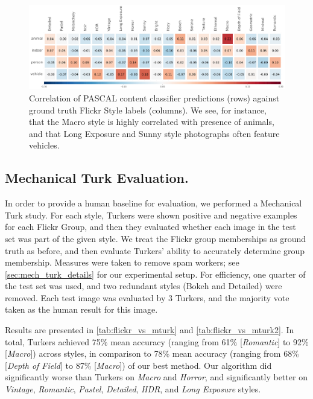 \begin{figure}[h]
\centering
    \includegraphics[width=\linewidth]{../style/figures/content_correlation2/pascal_on_flickr.pdf}
    \caption[Correlation of PASCAL content classifier predictions against ground truth Flickr Style labels.]{
        Correlation of PASCAL content classifier predictions (rows) against ground truth Flickr Style labels (columns).
        We see, for instance, that the Macro style is highly correlated with presence of animals, and that Long Exposure and Sunny style photographs often feature vehicles.
    }\label{fig:content_correlation}
\end{figure}

\subsection{Mechanical Turk Evaluation.}\label{sec:mech_turk_evaluation}
In order to provide a human baseline for evaluation, we performed a Mechanical Turk study.
For each style, Turkers were shown positive and negative examples for each Flickr Group, and then they evaluated whether each image in the test set was part of the given style.
We treat the Flickr group memberships as ground truth as before, and then evaluate Turkers' ability to accurately determine group membership.
Measures were taken to remove spam workers; see \autoref{sec:mech_turk_details} for our experimental setup.
For efficiency, one quarter of the test set was used, and two redundant styles (Bokeh and Detailed) were removed.
Each test image was evaluated by 3 Turkers, and the majority vote taken as the human result for this image.

Results are presented in \autoref{tab:flickr_vs_mturk} and \autoref{tab:flickr_vs_mturk2}.
In total, Turkers achieved 75\% mean accuracy (ranging from 61\% [\emph{Romantic}] to 92\% [\emph{Macro}]) across styles, in comparison to 78\% mean accuracy (ranging from 68\% [\emph{Depth of Field}] to 87\% [\emph{Macro}]) of our best method.
Our algorithm did significantly worse than Turkers on \emph{Macro} and \emph{Horror}, and significantly better on \emph{Vintage}, \emph{Romantic}, \emph{Pastel}, \emph{Detailed}, \emph{HDR}, and \emph{Long Exposure} styles.

